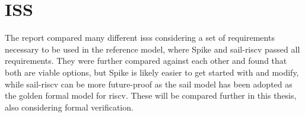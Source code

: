 \section{ISS}
\label{sec:pw_iss}

The report compared many different \acrshort{iss}s considering a set of requirements necessary to be used in the reference model, where Spike \cite{SpikeRISCVISA2023} and sail-riscv \cite{RISCVSailModel2023} passed all requirements. They were further compared against each other and found that both are viable options, but Spike is likely easier to get started with and modify, while sail-riscv can be more future-proof as the sail model has been adopted as the golden formal model for \acrshort{riscv}. These will be compared further in this thesis, also considering formal verification.




